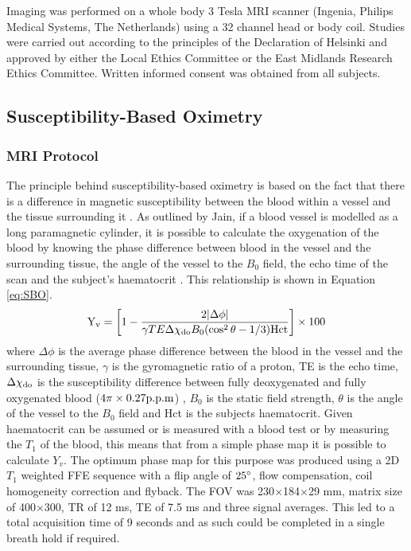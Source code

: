 Imaging was performed on a whole body 3 Tesla \ac{MRI} scanner (Ingenia, Philips Medical Systems, The Netherlands) using a 32 channel head or body coil. Studies were carried out according to the principles of the Declaration of Helsinki and approved by either the Local Ethics Committee or the East Midlands Research Ethics Committee. Written informed consent was obtained from all subjects.\\

\subsection{Susceptibility-Based Oximetry}
\label{sec:SBO}
\subsubsection{\ac{MRI} Protocol}
\label{sec:SBO_prot}
The principle behind susceptibility-based oximetry is based on the fact that there is a difference in magnetic susceptibility between the blood within a vessel and the tissue surrounding it \cite{haacke_vivo_1997}. As outlined by Jain, if a blood vessel is modelled as a long paramagnetic cylinder, it is possible to calculate the oxygenation of the blood by knowing the phase difference between blood in the vessel and the surrounding tissue, the angle of the vessel to the $B_0$ field, the echo time of the scan and the subject's haematocrit \cite{jain_mri_2010}. This relationship is shown in Equation \eqref{eq:SBO}.
\begin{equation}
\textup{Y}_{\textup{v}} = \left[ 1-\frac{2|\Delta\phi|}{\gamma TE\Delta\chi_{\textup{do}}B_0(\cos^2\theta-1/3)\textup{Hct}}\right]\times 100
\label{eq:SBO}
\end{equation}
where $\Delta\phi$ is the average phase difference between the blood in the vessel and the surrounding tissue, $\gamma$ is the gyromagnetic ratio of a proton, TE is the echo time, $\Delta\chi_{\textup{do}}$ is the susceptibility difference between fully deoxygenated and fully oxygenated blood ($4\pi\times0.27\textup{p.p.m}$) \cite{spees_water_2001, jain_investigating_2012}, $B_0$ is the static field strength, $\theta$ is the angle of the vessel to the $B_0$ field and Hct is the subjects haematocrit. Given haematocrit can be assumed or is measured with a blood test or by measuring the $T_1$ of the blood, this means that from a simple phase map it is possible to calculate $Y_v$. The optimum phase map for this purpose was produced using a 2D $T_1$ weighted \ac{FFE} sequence with a flip angle of $25\degree$, flow compensation, coil homogeneity correction and flyback. The \ac{FOV} was 230$\times$184$\times$29 mm, matrix size of 400$\times$300, \ac{TR} of 12 ms, \ac{TE} of 7.5 ms and three signal averages. This led to a total acquisition time of 9 seconds and as such could be completed in a single breath hold if required.\\

